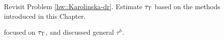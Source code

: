 \begin{HomeworkProblem}\label{exr:13-11}

Revisit Problem \ref{hw::Karolinska-dr}. Estimate $\tau_\textsc{T}$ based on the methods introduced in this Chapter.



\end{HomeworkProblem}

\begin{HomeworkProblem}\label{exr:13-12}

 \citet{shinozaki2015brief} focused on $\tau_\textsc{T}$, and \citet{li2018balancing} discussed general $\tau^h$.






\end{HomeworkProblem}
